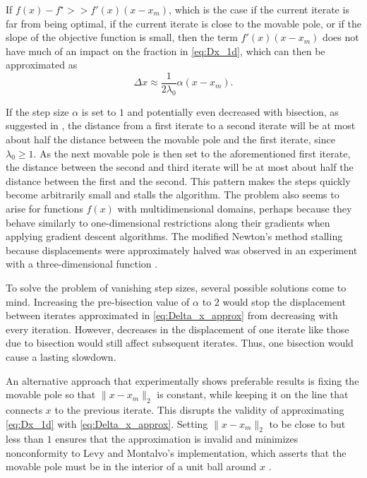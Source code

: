 \documentclass[a4paper,12pt,twoside]{article}
\begin{document}
If $f(x)-f^\star >> f'(x) (x-x_m)$, which is the case if the current iterate is far from being optimal, if the current iterate is close to the movable pole, or if the slope of the objective function is small, then the term $f'(x) (x-x_m)$ does not have much of an impact on the fraction in \eqref{eq:Dx_1d}, which can then be approximated as 
\begin{equation} \label{eq:Delta_x_approx}
\Delta x \approx \frac1{2\lambda_0} \alpha (x-x_m).
\end{equation}

If the step size $\alpha$ is set to $1$ and potentially even decreased with bisection, as suggested in \cite[\S 2.3.4]{levy_tunneling_1985}, the distance from a first iterate to a second iterate will be at most about half the distance between the movable pole and the first iterate, since $\lambda_0 \geq 1$. As the next movable pole is then set to the aforementioned first iterate, the distance between the second and third iterate will be at most about half the distance between the first and the second. This pattern makes the steps quickly become arbitrarily small and stalls the algorithm. The problem also seems to arise for functions $f(x)$ with multidimensional domains, perhaps because they behave similarly to one-dimensional restrictions along their gradients when applying gradient descent algorithms. The modified Newton's method stalling because displacements were approximately halved was observed in an experiment with a three-dimensional function \cite{heidbrink_nicolasheidbrinkoptimization-seminar_2026}. 

To solve the problem of vanishing step sizes, several possible solutions come to mind. Increasing the pre-bisection value of $\alpha$ to $2$ would stop the displacement between iterates approximated in \eqref{eq:Delta_x_approx} from decreasing with every iteration. However, decreases in the displacement of one iterate like those due to bisection would still affect subsequent iterates. Thus, one bisection would cause a lasting slowdown.

An alternative approach that experimentally shows preferable results is fixing the movable pole so that $\| x-x_m\|_2$ is constant, while keeping it on the line that connects $x$ to the previous iterate. This disrupts the validity of approximating \eqref{eq:Dx_1d} with \eqref{eq:Delta_x_approx}. Setting $\| x-x_m\|_2$ to be close to but less than $1$ ensures that the approximation is invalid and minimizes nonconformity to Levy and Montalvo's implementation, which asserts that the movable pole must be in the interior of a unit ball around $x$ \cite[27]{levy_tunneling_1985}.
\end{document}
